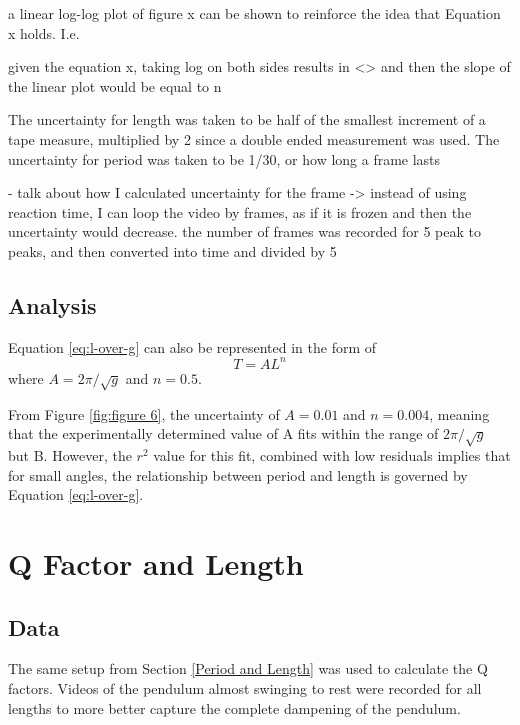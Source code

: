 \documentclass[12pt]{article}
\begin{document}
{a linear log-log plot of figure x can be shown to reinforce the idea that Equation x holds. I.e.

given the equation x, taking log on both sides results in <> and then the slope of the linear plot would be equal to n

The uncertainty for length was taken to be half of the smallest increment of a tape measure, multiplied by 2 since a double ended measurement was used. The uncertainty for period was taken to be 1/30, or how long a frame lasts

- talk about how I calculated uncertainty for the frame -> instead of using reaction time, I can loop the video by frames, as if it is frozen and then the uncertainty would decrease. the number of frames was recorded for 5 peak to peaks, and then converted into time and divided by 5


\subsection{Analysis}
Equation \ref{eq:l-over-g} can also be represented in the form of
\begin{equation}
    T = AL^{n}
\end{equation}
where $A = 2\pi/\sqrt{g}$ and $n = 0.5$.

From Figure \ref{fig:figure 6}, the uncertainty of $A = 0.01$ and $n = 0.004$, meaning that the experimentally determined value of A fits within the range of $2\pi/\sqrt{g}$ but B. However, the $r^2$ value for this fit, combined with low residuals implies that for small angles, the relationship between period and length is governed by Equation \ref{eq:l-over-g}.

\section{Q Factor and Length}

\subsection{Data}
The same setup from Section \ref{Period and Length} was used to calculate the Q factors. Videos of the pendulum almost swinging to rest were recorded for all lengths to more better capture the complete dampening of the pendulum.

}
\end{document}
